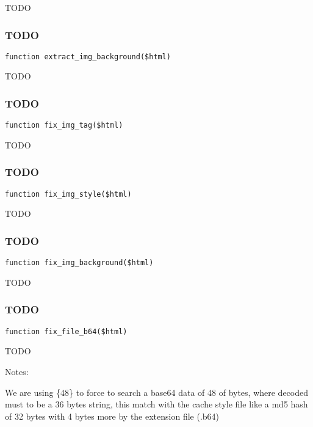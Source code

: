 \documentclass[a4paper]{article}
\begin{document}
TODO

\hypertarget{toc120}{}
\subsubsection{TODO}

\begin{lstlisting}
function extract_img_background($html)
\end{lstlisting}

TODO

\hypertarget{toc121}{}
\subsubsection{TODO}

\begin{lstlisting}
function fix_img_tag($html)
\end{lstlisting}

TODO

\hypertarget{toc122}{}
\subsubsection{TODO}

\begin{lstlisting}
function fix_img_style($html)
\end{lstlisting}

TODO

\hypertarget{toc123}{}
\subsubsection{TODO}

\begin{lstlisting}
function fix_img_background($html)
\end{lstlisting}

TODO

\hypertarget{toc124}{}
\subsubsection{TODO}

\begin{lstlisting}
function fix_file_b64($html)
\end{lstlisting}

TODO

Notes:

We are using \{48\} to force to search a base64 data of 48 of bytes, where decoded
must to be a 36 bytes string, this match with the cache style file like a md5 hash
of 32 bytes with 4 bytes more by the extension file (.b64)
\end{document}
